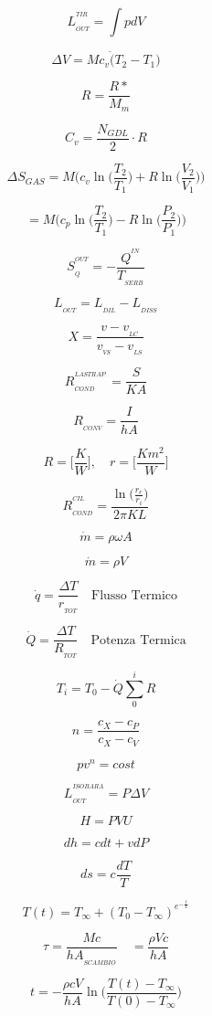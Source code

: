 \documentclass[10pt,portrait,a4paper]{article}
\begin{document}
\begin{multicols}{2}
		


\[L_{_{OUT}}^{^{TIR}}=\int pdV \]

\[\Delta V=Mc_{v}\dot (T_{2}-T_{1}) \]

\[R=\frac {R*}{M_{m}}\]

\[C_{v}=\frac{N_{GDL}}{2}\cdot R\]

\[\Delta S_{GAS} = M\bigg( c_v \ln \bigg( \frac{T_2}{T_1} \bigg)
		+R \ln \bigg( \frac{V_2}{V_1} \bigg) \bigg) \] \par
\[ = M\bigg( c_p \ln \bigg( \frac{T_2}{T_1} \bigg)
		- R \ln \bigg( \frac{P_2}{P_1} \bigg) \bigg)\]

\[ S_{_Q}^{^{OUT}}= - \frac{Q^{^{IN}}}{T_{_{SERB}}} \]

\[L_{_{OUT}}= L_{_{DIL}}- L_{_{DISS}} \]

\[ X =\frac{v - v_{_{LC}}}{v_{_{VS}} - v_{_{LS}}}\]

\[ R_{_{COND}}^{^{LASTRA P.}} =\frac{S}{KA}\]

\[ R_{_{CONV}} =\frac{I}{hA}\]
	
\[ R = \Big [\frac {K}{W}\Big ], \quad  r =\Big [\frac{Km^{2}}{W} \Big ]\]

\[ R_{_{COND}}^{^{CIL}} = \frac {\ln \Big ( \frac {r_{e}}{r_{i}} \Big )} {2 \pi KL} \]

\[ \dot m = \rho \omega A \]

\[ \dot m = \rho V \]

\[ \dot q =\frac{\Delta T}{r_{_{TOT}}}  \quad \textrm{Flusso Termico} \]

\[ \dot Q =\frac{\Delta T}{R_{_{TOT}}}  \quad \textrm{Potenza Termica} \]

\[ T_{i} = T_{0} - \dot Q \sum _{0}^{i} R \]	

\[ n = \frac {c_{X} - c_{P}}       {c_{X} - c_{V}} \]

\[pv^{n} = cost  \]

\[L_{_{OUT}}^{^{ISOBARA}}= P \Delta V \]

\[ H = PVU \]

\[ dh = cdt + vdP \]
	
\[ds= c \frac{dT}{T}\]

\[T(t) = T_{\infty} + (T_{0}-T_{\infty})^{e^{- \frac {t}{T}} }\]

\[ \tau = \frac {Mc}{hA_{_{SCAMBIO}}} \quad   = \frac{\rho Vc}{hA} \]

\[t = -  \frac {\rho cV}{hA} \ln \bigg ( \frac {T(t)-T_{\infty}}{T(0)-T_{\infty}}  \bigg )\]


\end{multicols}
\end{document}
